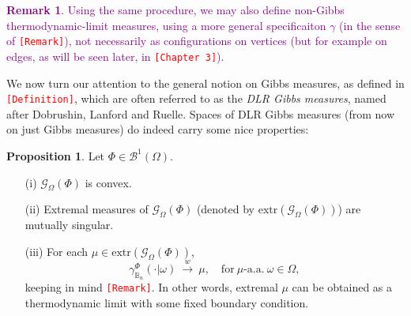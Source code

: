 \documentclass[12pt]{article}
\newcommand{\BB}{\mathscr{B}}
\newcommand{\BBB}{\mathbb{B}}
\newcommand{\G}{\mathcal{G}}
\newcommand{\extr}{\mathrm{extr}}
\newcommand{\pika}{\boldsymbol{\cdot}}
\newcommand{\1}{\mathbbm{1}}
\newcommand{\5}{\vspace{0.5cm}}
\theoremstyle{definition}
\newtheorem{prop}[thm]{Proposition}
\newtheorem{rem}[thm]{Remark}
\begin{document}
\textcolor{purple}{
\begin{rem}
Using the same procedure, we may also define non-Gibbs thermodynamic-limit measures, using a more general specificaiton $\gamma$ (in the sense of \textcolor{red}{\texttt{[Remark]}}), not necessarily as configurations on vertices (but for example on edges, as will be seen later, in \textcolor{red}{\texttt{[Chapter 3]}}).
\end{rem}
}

We now turn our attention to the general notion on Gibbs measures, as defined in \textcolor{red}{\texttt{[Definition]}}, which are often referred to as the \textit{DLR Gibbs measures}, named after Dobrushin, Lanford and Ruelle. Spaces of DLR Gibbs measures (from now on just Gibbs measures) do indeed carry some nice properties:
\begin{prop}
Let $\Phi\in\BB^1(\Omega)$.
\begin{itemize}
	\item[(i)] $\G_\Omega(\Phi)$ is convex.
	\item[(ii)] Extremal measures of $\G_\Omega(\Phi)$ (denoted by $\extr(\G_\Omega(\Phi))$) are mutually singular.
	\item[(iii)] For each $\mu\in\extr(\G_\Omega(\Phi))$,
	$$\gamma_{\BBB_n}^\Phi(\pika|\omega) ~\xrightarrow{w}~ \mu, \quad \text{for}~\mu\text{-a.a.}~\omega\in\Omega,$$
	keeping in mind \textcolor{red}{\texttt{[Remark]}}. In other words, extremal $\mu$ can be obtained as a thermodynamic limit with some fixed boundary condition.
\end{itemize}
\end{prop}
\end{document}
